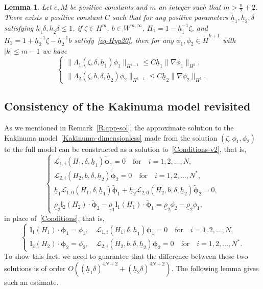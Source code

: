 \documentclass[11pt,leqno]{article}
\newtheorem{lemma}[theorem]{\bf Lemma}
\numberwithin{equation}{section}
\numberwithin{figure}{section}
\begin{document}
\begin{lemma}\label{L.estimate-DN2}
Let $c, M$ be positive constants and $m$ an integer such that $m>\frac{n}{2}+2$. 
There exists a positive constant $C$ such that for any positive parameters 
$\underline{h}_1, \underline{h}_2, \delta$ satisfying $\underline{h}_1\delta, \underline{h}_2\delta \leq 1$, 
if $\zeta\in H^m$, $b\in W^{m,\infty}$, $H_1 = 1 - \underline{h}_1^{-1}\zeta$, 
and $H_2 = 1 + \underline{h}_2^{-1}\zeta - \underline{h}_2^{-1}b$ satisfy~\eqref{eq-Hyp20}, 
then for any $\phi_1,\phi_2 \in \mathring{H}^{k+1}$ with $|k|\leq m-1$ we have 
%
\[
\begin{cases}
 \|\Lambda_1(\zeta,\delta,\underline{h}_1)\phi_1\|_{H^{k-1}} \leq C\underline{h}_1\|\nabla\phi_1\|_{H^k}, \\
 \|\Lambda_2(\zeta,b,\delta,\underline{h}_2)\phi_2\|_{H^{k-1}} \leq C\underline{h}_2\|\nabla\phi_2\|_{H^k}. 
\end{cases} 
\]
\end{lemma}
%
%
\subsection{Consistency of the Kakinuma model revisited}
%
As we mentioned in Remark~\ref{R.app-sol}, the approximate solution to the Kakinuma model~\eqref{Kakinuma-dimensionless}
made from the solution $(\zeta,\phi_1,\phi_2)$ to the full model can be constructed as a solution to~\eqref{Conditions-v2}, that is, 
%
\begin{equation}\label{Conditions-v2bis}
\begin{cases}
\mathcal{L}_{1,i}(H_1,\delta,\underline{h}_1)\tilde{\bm{\phi}}_1=0 \quad\mbox{for}\quad i=1,2,\ldots,N, \\
\mathcal{L}_{2,i}(H_2,b,\delta,\underline{h}_2)\tilde{\bm{\phi}}_2=0 \quad\mbox{for}\quad i=1,2,\ldots,N^*, \\
\underline{h}_1\mathcal{L}_{1,0}(H_1,\delta,\underline{h}_1) \tilde{\bm{\phi}}_1
+ \underline{h}_2\mathcal{L}_{2,0}(H_2,b,\delta,\underline{h}_2) \tilde{\bm{\phi}}_2 = 0, \\
\underline{\rho}_2\bm{l}_2(H_2) \cdot \tilde{\bm{\phi}}_2
- \underline{\rho}_1\bm{l}_1(H_1) \cdot \tilde{\bm{\phi}}_1 = \underline{\rho}_2\phi_2-\underline{\rho}_2\phi_1,
\end{cases}
\end{equation}
% 
in place of~\eqref{Conditions}, that is, 
%
\begin{equation}\label{Conditionsbis}
 \begin{cases}
  \bm{l}_1(H_1)\cdot\bm{\phi}_1=\phi_1, \quad \mathcal{L}_{1,i}(H_1,\delta,\underline{h}_1)\bm{\phi}_1=0
   \quad\mbox{for}\quad i=1,2,\ldots,N, \\
  \bm{l}_2(H_2)\cdot\bm{\phi}_2=\phi_2, \quad \mathcal{L}_{2,i}(H_2,b,\delta,\underline{h}_2)\bm{\phi}_2=0
   \quad\mbox{for}\quad i=1,2,\ldots,N^*.
 \end{cases}
\end{equation}
%
To show this fact, we need to guarantee that the difference between these two solutions is of order 
$O((\underline{h}_1\delta)^{4N+2}+(\underline{h}_2\delta)^{4N+2})$. 
The following lemma gives such an estimate. 
\end{document}

